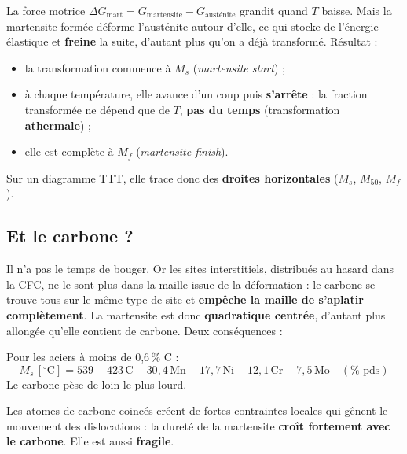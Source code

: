 \begin{propbox}[title={Pourquoi elle est athermale}]
La force motrice $\Delta G_{\text{mart}} = G_{\text{martensite}} - G_{\text{austénite}}$ grandit
quand $T$ baisse. Mais la martensite formée déforme l'austénite autour d'elle, ce qui stocke de
l'énergie élastique et \textbf{freine} la suite, d'autant plus qu'on a déjà transformé. Résultat :
\begin{itemize}
  \item la transformation commence à $M_s$ (\emph{martensite start}) ;
  \item à chaque température, elle avance d'un coup puis \textbf{s'arrête} : la fraction
        transformée ne dépend que de $T$, \textbf{pas du temps} (transformation
        \textbf{athermale}) ;
  \item elle est complète à $M_f$ (\emph{martensite finish}).
\end{itemize}
Sur un diagramme TTT, elle trace donc des \textbf{droites horizontales} ($M_s$, $M_{50}$, $M_f$).
\end{propbox}


\subsection*{Et le carbone ?}

Il n'a pas le temps de bouger. Or les sites interstitiels, distribués au hasard dans la CFC, ne
le sont plus dans la maille issue de la déformation : le carbone se trouve tous sur le même type
de site et \textbf{empêche la maille de s'aplatir complètement}. La martensite est donc
\textbf{quadratique centrée}, d'autant plus allongée qu'elle contient de carbone. Deux
conséquences :

\begin{thmbox}[title={$M_s$ baisse avec le carbone (et les autres éléments)}]
Pour les aciers à moins de 0,6\,\% C :
\[ M_s\,[^\circ\text{C}] = 539 - 423\,\text{C} - 30{,}4\,\text{Mn} - 17{,}7\,\text{Ni}
   - 12{,}1\,\text{Cr} - 7{,}5\,\text{Mo} \quad (\%\text{ pds}) \]
Le carbone pèse de loin le plus lourd.
\end{thmbox}

\begin{propbox}[title={La martensite est très dure}]
Les atomes de carbone coincés créent de fortes contraintes locales qui gênent le mouvement des
dislocations : la dureté de la martensite \textbf{croît fortement avec le carbone}. Elle est aussi
\textbf{fragile}.
\end{propbox}

